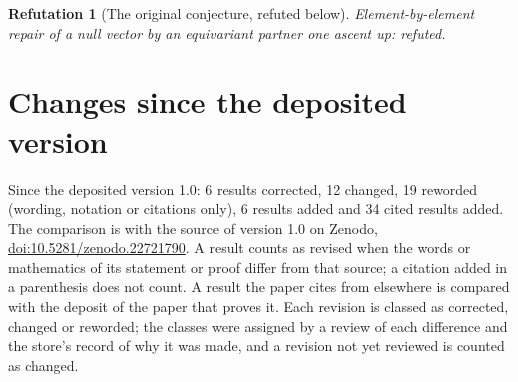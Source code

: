 \documentclass[11pt]{article}
\newtheorem{refutation}[theorem]{Refutation}
\theoremstyle{definition}
\theoremstyle{plain}
\begin{document}
\begin{refutation}[The original conjecture, refuted below]\label{c:transport.original-conjecture-refuted-below}
Element-by-element repair of a null vector by an equivariant partner one ascent up: refuted.
\end{refutation}

\section*{Changes since the deposited version}
Since the deposited version 1.0: 6 results corrected, 12 changed, 19 reworded (wording, notation or citations only), 6 results added and 34 cited results added. The comparison is with the source of version 1.0 on Zenodo, \href{https://doi.org/10.5281/zenodo.22721790}{doi:10.5281/zenodo.22721790}. A result counts as revised when the words or mathematics of its statement or proof differ from that source; a citation added in a parenthesis does not count. A result the paper cites from elsewhere is compared with the deposit of the paper that proves it. Each revision is classed as corrected, changed or reworded; the classes were assigned by a review of each difference and the store's record of why it was made, and a revision not yet reviewed is counted as changed.
\end{document}
